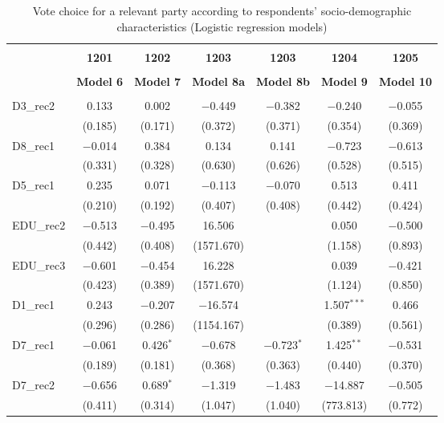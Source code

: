 \documentclass[
]{article}
\begin{document}
\begin{table}[!htbp] \centering 
  \caption{Vote choice for a relevant party according to respondents' 
                       socio-demographic characteristics (Logistic regression models)} 
  \label{table:full_logit_el} 
\begin{tabular}{@{\extracolsep{5pt}}lcccccc} 
\\[-1.8ex]\hline \\[-1.8ex] 
 & \textbf{1201} & \textbf{1202} & \textbf{1203} & \textbf{1203} & \textbf{1204} & \textbf{1205} \\ 
\\[-1.8ex] & \textbf{Model 6} & \textbf{Model 7} & \textbf{Model 8a} & \textbf{Model 8b} & \textbf{Model 9} & \textbf{Model 10}\\ 
\hline \\[-1.8ex] 
 D3\_rec2 & 0.133 & 0.002 & $-$0.449 & $-$0.382 & $-$0.240 & $-$0.055 \\ 
  & (0.185) & (0.171) & (0.372) & (0.371) & (0.354) & (0.369) \\ 
  D8\_rec1 & $-$0.014 & 0.384 & 0.134 & 0.141 & $-$0.723 & $-$0.613 \\ 
  & (0.331) & (0.328) & (0.630) & (0.626) & (0.528) & (0.515) \\ 
  D5\_rec1 & 0.235 & 0.071 & $-$0.113 & $-$0.070 & 0.513 & 0.411 \\ 
  & (0.210) & (0.192) & (0.407) & (0.408) & (0.442) & (0.424) \\ 
  EDU\_rec2 & $-$0.513 & $-$0.495 & 16.506 &  & 0.050 & $-$0.500 \\ 
  & (0.442) & (0.408) & (1571.670) &  & (1.158) & (0.893) \\ 
  EDU\_rec3 & $-$0.601 & $-$0.454 & 16.228 &  & 0.039 & $-$0.421 \\ 
  & (0.423) & (0.389) & (1571.670) &  & (1.124) & (0.850) \\ 
  D1\_rec1 & 0.243 & $-$0.207 & $-$16.574 &  & 1.507$^{***}$ & 0.466 \\ 
  & (0.296) & (0.286) & (1154.167) &  & (0.389) & (0.561) \\ 
  D7\_rec1 & $-$0.061 & 0.426$^{*}$ & $-$0.678 & $-$0.723$^{*}$ & 1.425$^{**}$ & $-$0.531 \\ 
  & (0.189) & (0.181) & (0.368) & (0.363) & (0.440) & (0.370) \\ 
  D7\_rec2 & $-$0.656 & 0.689$^{*}$ & $-$1.319 & $-$1.483 & $-$14.887 & $-$0.505 \\ 
  & (0.411) & (0.314) & (1.047) & (1.040) & (773.813) & (0.772) \\ 

\end{tabular}
\end{table}
\end{document}
